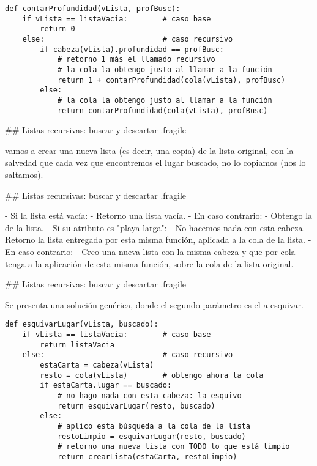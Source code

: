 \begin{lstlisting}[style=frame02]
def contarProfundidad(vLista, profBusc):
    if vLista == listaVacia:        # caso base
        return 0
    else:                           # caso recursivo
        if cabeza(vLista).profundidad == profBusc:
            # retorno 1 más el llamado recursivo
            # la cola la obtengo justo al llamar a la función
            return 1 + contarProfundidad(cola(vLista), profBusc)
        else:
            # la cola la obtengo justo al llamar a la función
            return contarProfundidad(cola(vLista), profBusc)
\end{lstlisting}


## Listas recursivas: buscar y descartar {.fragile}


\vspace{1ex}

\bgnblockidea
{} vamos a crear una nueva lista (es decir, una copia) de la lista
original, con la salvedad que cada vez que encontremos el lugar buscado,
no lo copiamos (nos lo saltamos).
\trmblockidea

## Listas recursivas: buscar y descartar {.fragile}


\vspace{1ex}

- Si la lista está vacía:
    - Retorno una lista vacía.
- En caso contrario:
    - Obtengo la  de la lista.
    - Si su atributo   es "playa larga":
        - No hacemos nada con esta cabeza. 
        - Retorno la lista entregada por esta misma función, aplicada a la cola de la lista.
    - En caso contrario:
        - Creo una nueva lista con la misma cabeza y que por cola tenga a la aplicación de
        esta misma función, sobre la cola de la lista original.

## Listas recursivas: buscar y descartar {.fragile}


\footnotesize Se presenta una solución genérica, donde el segundo parámetro es el  a esquivar.

\begin{lstlisting}[style=frame02]
def esquivarLugar(vLista, buscado):
    if vLista == listaVacia:        # caso base
        return listaVacia
    else:                           # caso recursivo
        estaCarta = cabeza(vLista)
        resto = cola(vLista)        # obtengo ahora la cola
        if estaCarta.lugar == buscado:
            # no hago nada con esta cabeza: la esquivo
            return esquivarLugar(resto, buscado)
        else:
            # aplico esta búsqueda a la cola de la lista
            restoLimpio = esquivarLugar(resto, buscado)
            # retorno una nueva lista con TODO lo que está limpio
            return crearLista(estaCarta, restoLimpio)
\end{lstlisting}




